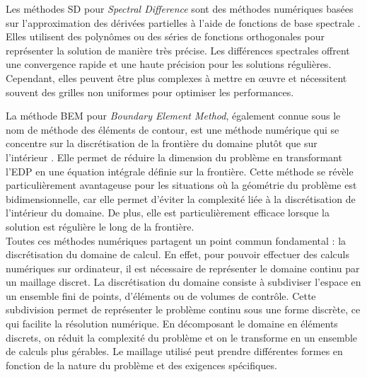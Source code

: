 Les méthodes SD pour \emph{Spectral Difference} sont des méthodes numériques basées sur l'approximation des dérivées partielles à l'aide de fonctions de base spectrale \cite{liu2006spectral, van2008stability}. Elles utilisent des polynômes ou des séries de fonctions orthogonales pour représenter la solution de manière très précise. Les différences spectrales offrent une convergence rapide et une haute précision pour les solutions régulières. Cependant, elles peuvent être plus complexes à mettre en œuvre et nécessitent souvent des grilles non uniformes pour optimiser les performances.


La méthode BEM pour \emph{Boundary Element Method}, également connue sous le nom de méthode des éléments de contour, est une méthode numérique qui se concentre sur la discrétisation de la frontière du domaine plutôt que sur l'intérieur \cite{nedelec2001acoustic, wu2002boundary, kirkup2019boundary}. Elle permet de réduire la dimension du problème en transformant l'EDP en une équation intégrale définie sur la frontière. Cette méthode se révèle particulièrement avantageuse pour les situations où la géométrie du problème est bidimensionnelle, car elle permet d'éviter la complexité liée à la discrétisation de l'intérieur du domaine. De plus, elle est particulièrement efficace lorsque la solution est régulière le long de la frontière.\\

Toutes ces méthodes numériques partagent un point commun fondamental : la discrétisation du domaine de calcul. En effet, pour pouvoir effectuer des calculs numériques sur ordinateur, il est nécessaire de représenter le domaine continu par un maillage discret. La discrétisation du domaine consiste à subdiviser l'espace en un ensemble fini de points, d'éléments ou de volumes de contrôle. Cette subdivision permet de représenter le problème continu sous une forme discrète, ce qui facilite la résolution numérique. En décomposant le domaine en éléments discrets, on réduit la complexité du problème et on le transforme en un ensemble de calculs plus gérables. Le maillage utilisé peut prendre différentes formes en fonction de la nature du problème et des exigences spécifiques.


